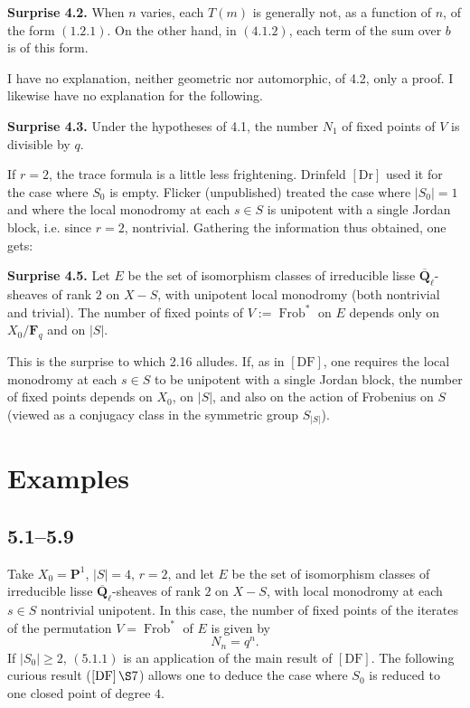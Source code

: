 \documentclass[11pt]{article}
\newcommand{\Qbar}{\overline{\mathbf Q}}
\newcommand{\Fq}{\mathbf F_q}
\newcommand{\Frob}{\operatorname{Frob}}
\begin{document}
\textbf{Surprise 4.2.} When \(n\) varies, each \(T(m)\) is generally not, as a function of \(n\), of the form \((1.2.1)\). On the other hand, in \((4.1.2)\), each term of the sum over \(b\) is of this form.

I have no explanation, neither geometric nor automorphic, of 4.2, only a proof. I likewise have no explanation for the following.

\textbf{Surprise 4.3.} Under the hypotheses of 4.1, the number \(N_1\) of fixed points of \(V\) is divisible by \(q\).

If \(r=2\), the trace formula is a little less frightening. Drinfeld \([\mathrm{Dr}]\) used it for the case where \(S_0\) is empty. Flicker (unpublished) treated the case where \(|S_0|=1\) and where the local monodromy at each \(s\in S\) is unipotent with a single Jordan block, i.e. since \(r=2\), nontrivial. Gathering the information thus obtained, one gets:

\textbf{Surprise 4.5.} Let \(E\) be the set of isomorphism classes of irreducible lisse \(\Qbar_\ell\)-sheaves of rank \(2\) on \(X-S\), with unipotent local monodromy (both nontrivial and trivial). The number of fixed points of \(V:=\Frob^*\) on \(E\) depends only on \(X_0/\Fq\) and on \(|S|\).

This is the surprise to which 2.16 alludes. If, as in \([\mathrm{DF}]\), one requires the local monodromy at each \(s\in S\) to be unipotent with a single Jordan block, the number of fixed points depends on \(X_0\), on \(|S|\), and also on the action of Frobenius on \(S\) (viewed as a conjugacy class in the symmetric group \(S_{|S|}\)).

\section{Examples}

\subsection{5.1--5.9}
Take \(X_0=\mathbf P^1\), \(|S|=4\), \(r=2\), and let \(E\) be the set of isomorphism classes of irreducible lisse \(\Qbar_\ell\)-sheaves of rank \(2\) on \(X-S\), with local monodromy at each \(s\in S\) nontrivial unipotent. In this case, the number of fixed points of the iterates of the permutation \(V=\Frob^*\) of \(E\) is given by
\begin{equation}\tag{5.1.1}
N_n=q^n.
\end{equation}
If \(|S_0|\ge 2\), \((5.1.1)\) is an application of the main result of \([\mathrm{DF}]\). The following curious result (\([\mathrm{DF}]\,\S7\)) allows one to deduce the case where \(S_0\) is reduced to one closed point of degree \(4\).
\end{document}
